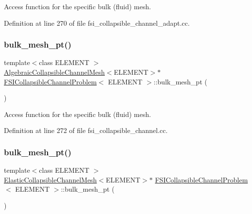 Access function for the specific bulk (fluid) mesh. 



Definition at line 270 of file fsi\+\_\+collapsible\+\_\+channel\+\_\+adapt.\+cc.

\mbox{\label{classFSICollapsibleChannelProblem_a9b461f3afef3185ea0b461714675ef8f}} 
\subsubsection{\texorpdfstring{bulk\+\_\+mesh\+\_\+pt()}{bulk\_mesh\_pt()}\hspace{0.1cm}{\footnotesize\ttfamily [4/6]}}
{\footnotesize\ttfamily template$<$class E\+L\+E\+M\+E\+NT $>$ \\
\hyperlink{classoomph_1_1AlgebraicCollapsibleChannelMesh}{Algebraic\+Collapsible\+Channel\+Mesh}$<$E\+L\+E\+M\+E\+NT$>$$\ast$ \hyperlink{classFSICollapsibleChannelProblem}{F\+S\+I\+Collapsible\+Channel\+Problem}$<$ E\+L\+E\+M\+E\+NT $>$\+::bulk\+\_\+mesh\+\_\+pt (\begin{DoxyParamCaption}{ }\end{DoxyParamCaption})\hspace{0.3cm}{\ttfamily [inline]}}



Access function for the specific bulk (fluid) mesh. 



Definition at line 272 of file fsi\+\_\+collapsible\+\_\+channel.\+cc.

\mbox{\label{classFSICollapsibleChannelProblem_a90bfc02608e7fa6a69b14b6d5cfb939e}} 
\subsubsection{\texorpdfstring{bulk\+\_\+mesh\+\_\+pt()}{bulk\_mesh\_pt()}\hspace{0.1cm}{\footnotesize\ttfamily [5/6]}}
{\footnotesize\ttfamily template$<$class E\+L\+E\+M\+E\+NT $>$ \\
\hyperlink{classElasticCollapsibleChannelMesh}{Elastic\+Collapsible\+Channel\+Mesh}$<$E\+L\+E\+M\+E\+NT$>$$\ast$ \hyperlink{classFSICollapsibleChannelProblem}{F\+S\+I\+Collapsible\+Channel\+Problem}$<$ E\+L\+E\+M\+E\+NT $>$\+::bulk\+\_\+mesh\+\_\+pt (\begin{DoxyParamCaption}{ }\end{DoxyParamCaption})\hspace{0.3cm}{\ttfamily [inline]}}



